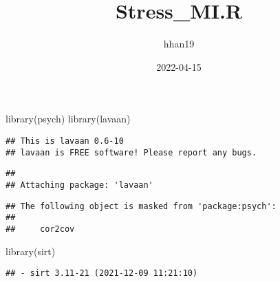 \documentclass[
]{article}
\title{Stress\_MI.R}
\author{hhan19}
\date{2022-04-15}
\newenvironment{Shaded}{\begin{snugshade}}{\end{snugshade}}
\newcommand{\FunctionTok}[1]{\textcolor[rgb]{0.00,0.00,0.00}{#1}}
\newcommand{\NormalTok}[1]{#1}
\begin{document}
\maketitle

\begin{Shaded}
\begin{Highlighting}[]
\FunctionTok{library}\NormalTok{(psych)}
\FunctionTok{library}\NormalTok{(lavaan)}
\end{Highlighting}
\end{Shaded}

\begin{verbatim}
## This is lavaan 0.6-10
## lavaan is FREE software! Please report any bugs.
\end{verbatim}

\begin{verbatim}
## 
## Attaching package: 'lavaan'
\end{verbatim}

\begin{verbatim}
## The following object is masked from 'package:psych':
## 
##     cor2cov
\end{verbatim}

\begin{Shaded}
\begin{Highlighting}[]
\FunctionTok{library}\NormalTok{(sirt)}
\end{Highlighting}
\end{Shaded}

\begin{verbatim}
## - sirt 3.11-21 (2021-12-09 11:21:10)
\end{verbatim}
\end{document}
